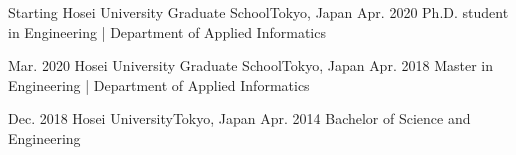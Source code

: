 
\begin{educations}
  \education
  {Starting} {Hosei University Graduate School}{Tokyo, Japan}{}
  {Apr. 2020} {Ph.D. student in Engineering | Department of Applied Informatics}

  \emptySeparator
  \education
  {Mar. 2020} {Hosei University Graduate School}{Tokyo, Japan}{}
  {Apr. 2018} {Master in Engineering | Department of Applied Informatics}

  \emptySeparator
  \education
  {Dec. 2018} {Hosei University}{Tokyo, Japan}{}
  {Apr. 2014} {Bachelor of Science and Engineering}
\end{educations}
